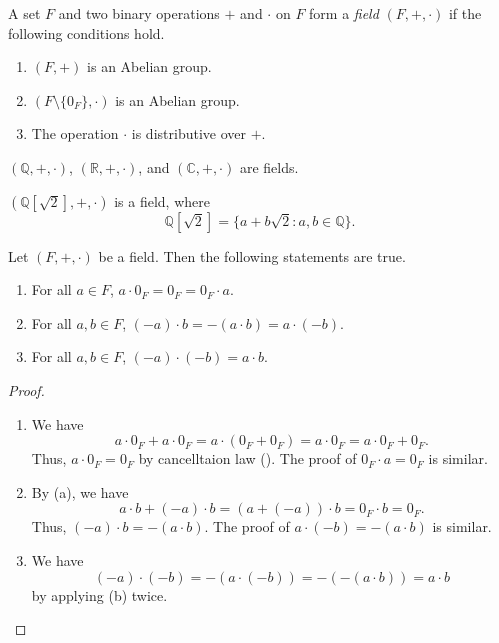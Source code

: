 \begin{definition}\label{def:field}
  A set $F$ and two binary operations $+$ and $\cdot$ on $F$ form a
  \emph{field} $(F, +, \cdot)$ if the following conditions hold.
  \begin{enumerate}[label=(F \arabic*),leftmargin=3.5em]
    \item $(F, +)$ is an Abelian group.
    \item $(F \setminus \{0_F\}, \cdot)$ is an Abelian group.
    \item The operation $\cdot$ is distributive over $+$.
  \end{enumerate}
\end{definition}

\begin{example}
  $(\mathbb{Q}, +, \cdot)$, $(\mathbb{R}, +, \cdot)$,
  and $(\mathbb{C}, +, \cdot)$ are fields.
\end{example}

\begin{example}
  $(\mathbb{Q}[\sqrt{2}], +, \cdot)$ is a field, where
  $$
  \mathbb{Q}[\sqrt{2}] = \{a + b\sqrt{2} : a, b \in \mathbb{Q}\}.
  $$
\end{example}

\begin{theorem}\label{thm:field-multiplication}
  Let $(F, +, \cdot)$ be a field. Then the following statements are true.
  \begin{enumerate}
    \item For all $a \in F$, $a \cdot 0_F = 0_F = 0_F \cdot a$.
    \item For all $a, b \in F$, $(-a) \cdot b = -(a \cdot b) = a \cdot (-b)$.
    \item For all $a, b \in F$, $(-a) \cdot (-b) = a \cdot b$.
  \end{enumerate}
\end{theorem}
\begin{proof} \leavevmode
  \begin{enumerate}
    \item We have
      $$
      a \cdot 0_F + a \cdot 0_F
      = a \cdot (0_F + 0_F)
      = a \cdot 0_F
      = a \cdot 0_F + 0_F.
      $$
      Thus, $a \cdot 0_F = 0_F$ by cancelltaion law
      (). The proof of $0_F \cdot a = 0_F$ is similar.
    \item By (a), we have
      $$
      a \cdot b + (-a) \cdot b
      = (a + (-a)) \cdot b
      = 0_F \cdot b
      = 0_F.
      $$
      Thus, $(-a) \cdot b = -(a \cdot b)$.
      The proof of $a \cdot (-b) = -(a \cdot b)$ is similar.
    \item We have
      $$
      (-a) \cdot (-b) = -(a \cdot (-b)) = -(-(a \cdot b)) = a \cdot b
      $$
      by applying (b) twice. \qedhere
  \end{enumerate}
\end{proof}

